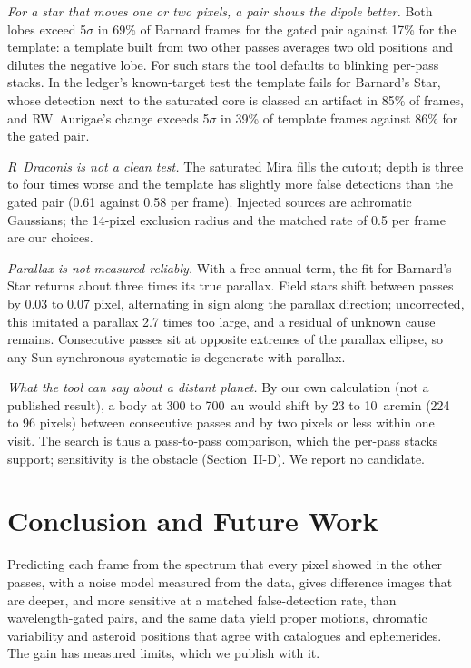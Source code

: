 \documentclass[conference]{IEEEtran}
\begin{document}
\emph{For a star that moves one or two pixels, a pair shows the dipole better.} Both lobes exceed 5$\sigma$ in 69\% of Barnard frames for the gated pair against 17\% for the template: a template built from two other passes averages two old positions and dilutes the negative lobe. For such stars the tool defaults to blinking per-pass stacks. In the ledger's known-target test the template fails for Barnard's Star, whose detection next to the saturated core is classed an artifact in 85\% of frames, and RW~Aurigae's change exceeds 5$\sigma$ in 39\% of template frames against 86\% for the gated pair.

\emph{R~Draconis is not a clean test.} The saturated Mira fills the cutout; depth is three to four times worse and the template has slightly more false detections than the gated pair (0.61 against 0.58 per frame). Injected sources are achromatic Gaussians; the 14-pixel exclusion radius and the matched rate of 0.5 per frame are our choices.

\emph{Parallax is not measured reliably.} With a free annual term, the fit for Barnard's Star returns about three times its true parallax. Field stars shift between passes by 0.03 to 0.07 pixel, alternating in sign along the parallax direction; uncorrected, this imitated a parallax 2.7 times too large, and a residual of unknown cause remains. Consecutive passes sit at opposite extremes of the parallax ellipse, so any Sun-synchronous systematic is degenerate with parallax.

\emph{What the tool can say about a distant planet.} By our own calculation (not a published result), a body at 300 to 700~au would shift by 23 to 10~arcmin (224 to 96 pixels) between consecutive passes and by two pixels or less within one visit. The search is thus a pass-to-pass comparison, which the per-pass stacks support; sensitivity is the obstacle (Section~II-D). We report no candidate.

\section{Conclusion and Future Work}

Predicting each frame from the spectrum that every pixel showed in the other passes, with a noise model measured from the data, gives difference images that are deeper, and more sensitive at a matched false-detection rate, than wavelength-gated pairs, and the same data yield proper motions, chromatic variability and asteroid positions that agree with catalogues and ephemerides. The gain has measured limits, which we publish with it.
\end{document}
